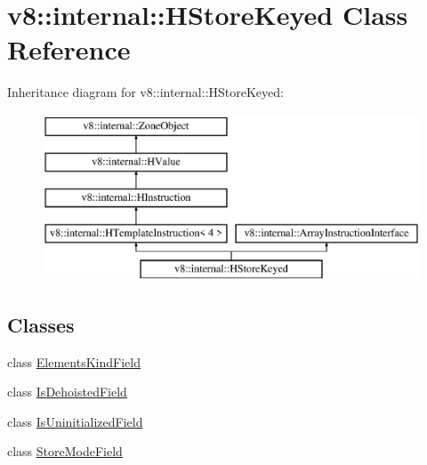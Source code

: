 \hypertarget{classv8_1_1internal_1_1_h_store_keyed}{}\section{v8\+:\+:internal\+:\+:H\+Store\+Keyed Class Reference}
\label{classv8_1_1internal_1_1_h_store_keyed}
Inheritance diagram for v8\+:\+:internal\+:\+:H\+Store\+Keyed\+:\begin{figure}[H]
\begin{center}
\leavevmode
\includegraphics[height=5.000000cm]{classv8_1_1internal_1_1_h_store_keyed}
\end{center}
\end{figure}
\subsection*{Classes}
\begin{DoxyCompactItemize}
\item 
class \hyperlink{classv8_1_1internal_1_1_h_store_keyed_1_1_elements_kind_field}{Elements\+Kind\+Field}
\item 
class \hyperlink{classv8_1_1internal_1_1_h_store_keyed_1_1_is_dehoisted_field}{Is\+Dehoisted\+Field}
\item 
class \hyperlink{classv8_1_1internal_1_1_h_store_keyed_1_1_is_uninitialized_field}{Is\+Uninitialized\+Field}
\item 
class \hyperlink{classv8_1_1internal_1_1_h_store_keyed_1_1_store_mode_field}{Store\+Mode\+Field}
\end{DoxyCompactItemize}
